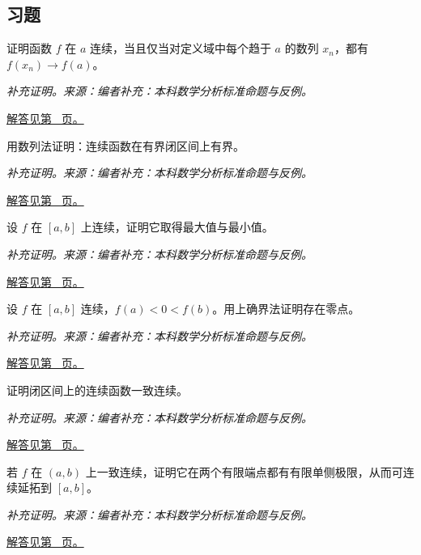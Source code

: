 \documentclass[UTF8,12pt,a4paper,fontset=fandol]{ctexart}
\begin{document}
\subsection{习题}
\begin{example}[连续函数的序列判别]\label{ex:c7q1}
证明函数 $f$ 在 $a$ 连续，当且仅当对定义域中每个趋于 $a$ 的数列 $x_n$，都有 $f(x_n)\to f(a)$。
\par\textit{补充证明。来源：编者补充：本科数学分析标准命题与反例。}\par\hyperref[ans:c7q1]{解答见第~\pageref{ans:c7q1} 页。}
\end{example}
\begin{example}[闭区间连续函数有界]\label{ex:c7q2}
用数列法证明：连续函数在有界闭区间上有界。
\par\textit{补充证明。来源：编者补充：本科数学分析标准命题与反例。}\par\hyperref[ans:c7q2]{解答见第~\pageref{ans:c7q2} 页。}
\end{example}
\begin{example}[最大值定理的证明]\label{ex:c7q3}
设 $f$ 在 $[a,b]$ 上连续，证明它取得最大值与最小值。
\par\textit{补充证明。来源：编者补充：本科数学分析标准命题与反例。}\par\hyperref[ans:c7q3]{解答见第~\pageref{ans:c7q3} 页。}
\end{example}
\begin{example}[介值定理的上确界证明]\label{ex:c7q4}
设 $f$ 在 $[a,b]$ 连续，$f(a)<0<f(b)$。用上确界法证明存在零点。
\par\textit{补充证明。来源：编者补充：本科数学分析标准命题与反例。}\par\hyperref[ans:c7q4]{解答见第~\pageref{ans:c7q4} 页。}
\end{example}
\begin{example}[闭区间上一致连续]\label{ex:c7q5}
证明闭区间上的连续函数一致连续。
\par\textit{补充证明。来源：编者补充：本科数学分析标准命题与反例。}\par\hyperref[ans:c7q5]{解答见第~\pageref{ans:c7q5} 页。}
\end{example}
\begin{example}[一致连续延拓到端点]\label{ex:c7q6}
若 $f$ 在 $(a,b)$ 上一致连续，证明它在两个有限端点都有有限单侧极限，从而可连续延拓到 $[a,b]$。
\par\textit{补充证明。来源：编者补充：本科数学分析标准命题与反例。}\par\hyperref[ans:c7q6]{解答见第~\pageref{ans:c7q6} 页。}
\end{example}
\end{document}
